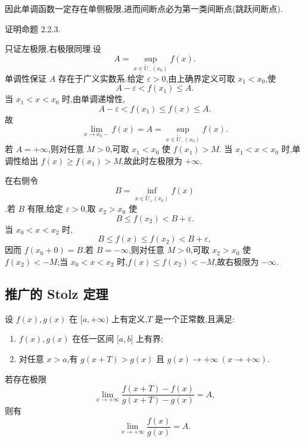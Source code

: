 \begin{remark}
    因此单调函数一定存在单侧极限,进而间断点必为第一类间断点(跳跃间断点).
\end{remark}

\begin{example}
    证明命题 2.2.3.
\end{example}
\exampleblank

\begin{solution}
    只证左极限,右极限同理.设
    \[
        A=\sup\limits_{x\in\mathring{U}_{-}(x_0)}f(x).
    \]
    单调性保证 $A$ 存在于广义实数系.给定 $\varepsilon>0$,由上确界定义可取
    $x_1<x_0$,使
    \[
        A-\varepsilon<f(x_1)\leq A.
    \]
    当 $x_1<x<x_0$ 时,由单调递增性,
    \[
        A-\varepsilon<f(x_1)\leq f(x)\leq A.
    \]
    故
    \[
        \lim\limits_{x\to x_0-}f(x)=A
        =\sup\limits_{x\in\mathring{U}_{-}(x_0)}f(x).
    \]
    若 $A=+\infty$,则对任意 $M>0$,可取 $x_1<x_0$ 使 $f(x_1)>M$.
    当 $x_1<x<x_0$ 时,单调性给出 $f(x)\geq f(x_1)>M$,故此时左极限为 $+\infty$.

    在右侧令
    \[
        B=\inf\limits_{x\in\mathring{U}_{+}(x_0)}f(x)
    \]
    .若 $B$ 有限,给定 $\varepsilon>0$,取 $x_2>x_0$ 使
    \[
        B\leq f(x_2)<B+\varepsilon.
    \]
    当 $x_0<x<x_2$ 时,
    \[
        B\leq f(x)\leq f(x_2)<B+\varepsilon,
    \]
    因而 $f(x_0+0)=B$.若 $B=-\infty$,则对任意 $M>0$,可取 $x_2>x_0$
    使 $f(x_2)<-M$;当 $x_0<x<x_2$ 时,$f(x)\leq f(x_2)<-M$,故右极限为 $-\infty$.
\end{solution}



\subsection{推广的 Stolz 定理}

\begin{theorem}
    设 $f(x),g(x)$ 在 $\lbrack a,+\infty)$ 上有定义,$T$ 是一个正常数,且满足:
    \begin{enumerate}
        \item $f(x),g(x)$ 在任一区间 $\lbrack a,b\rbrack$ 上有界;
        \item 对任意 $x>a$,有 $g(x+T)>g(x)$ 且 $g(x)\to+\infty\ (x\to+\infty)$.
    \end{enumerate}
    若存在极限
    \[
        \lim\limits_{x\to+\infty}
        \dfrac{f(x+T)-f(x)}{g(x+T)-g(x)}=A,
    \]
    则有
    \[
        \lim\limits_{x\to+\infty}\dfrac{f(x)}{g(x)}=A.
    \]
\end{theorem}

